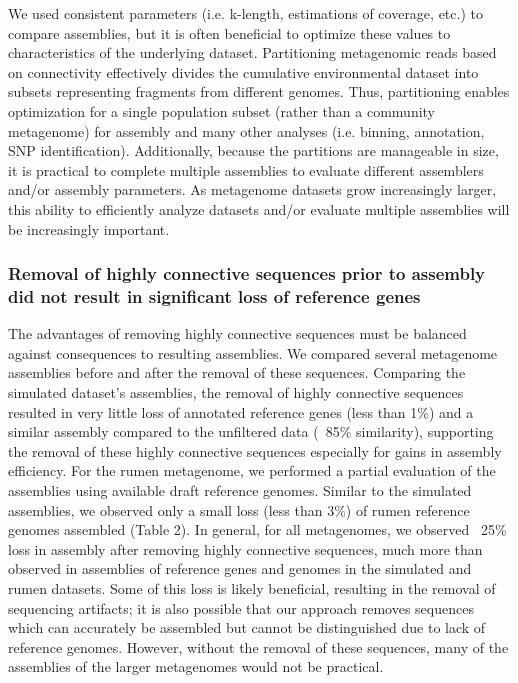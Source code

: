 \documentclass[10pt]{article}
\begin{document}
We used consistent parameters (i.e. k-length, estimations of coverage, etc.) to compare assemblies, but it is often beneficial to optimize these values to characteristics of the underlying dataset.  Partitioning metagenomic reads based on connectivity effectively divides the cumulative environmental dataset into subsets representing fragments from different genomes.  Thus, partitioning enables optimization for a single population subset (rather than a community metagenome) for assembly and many other analyses (i.e. binning, annotation, SNP identification).  Additionally, because the partitions are manageable in size, it is practical to complete multiple assemblies to evaluate different assemblers and/or assembly parameters.  As metagenome datasets grow increasingly larger, this ability to efficiently analyze datasets and/or evaluate multiple assemblies will be increasingly important.

\subsubsection*{Removal of highly connective sequences prior to assembly did not result in significant loss of reference genes}
The advantages of removing highly connective sequences must be balanced against consequences to resulting assemblies.  We compared several metagenome assemblies before and after the removal of these sequences.   Comparing the simulated dataset's assemblies, the removal of highly connective sequences resulted in very little loss of annotated reference genes (less than 1\%) and a similar assembly compared to the unfiltered data (~85\% similarity), supporting the removal of these highly connective sequences especially for gains in assembly efficiency.  For the rumen metagenome, we performed a partial evaluation of the assemblies using available draft reference genomes.   Similar to the simulated assemblies, we observed only a small loss (less than 3\%) of rumen reference genomes assembled (Table 2).  In general, for all metagenomes, we observed ~25\% loss in assembly after removing highly connective sequences, much more than observed in assemblies of reference genes and genomes in the simulated and rumen datasets.  Some of this loss is likely beneficial, resulting in the removal of sequencing artifacts; it is also possible that our approach removes sequences which can accurately be assembled but cannot be distinguished due to lack of reference genomes.  However, without the removal of these sequences, many of the assemblies of the larger metagenomes would not be practical. 
\end{document}
